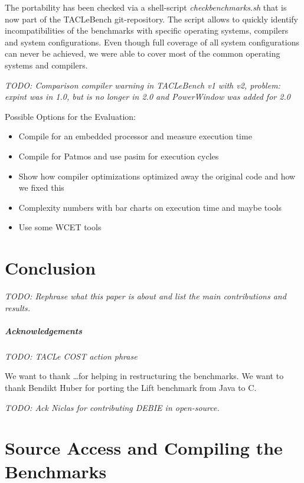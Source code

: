\documentclass[a4paper,UKenglish]{oasics}
\newcommand{\todo}[1]{{\emph{TODO: #1}}}
\begin{document}
The portability has been checked via a shell-script \textit{checkbenchmarks.sh} that is now part of the TACLeBench git-repository.
The script allows to quickly identify incompatibilities of the benchmarks with specific operating systems, compilers and system configurations.
Even though full coverage of all system configurations can never be achieved, we were able to cover most of the common operating systems and compilers.


\todo{Comparison compiler warning in TACLeBench v1 with v2, problem: expint was in 1.0, but is no
longer in 2.0 and PowerWindow was added for 2.0}

Possible Options for the Evaluation:

\begin{itemize}
\item Compile for an embedded processor and measure execution time
\item Compile for Patmos and use pasim for execution cycles
\item Show how compiler optimizations optimized away the original code and how we fixed this
\item Complexity numbers with bar charts on execution time and maybe tools
\item Use some WCET tools
\end{itemize}


\section{Conclusion}
\label{sec:conclusion}

\todo{Rephrase what this paper is about and list the main contributions and results.}

\subparagraph*{Acknowledgements}

\todo{TACLe COST action phrase}

We want to thank \dots for helping in restructuring the benchmarks.
We want to thank Bendikt Huber for porting the Lift benchmark from Java to C.

\todo{Ack Niclas for contributing DEBIE in open-source.}

\appendix
\section{Source Access and Compiling the Benchmarks}



\end{document}
